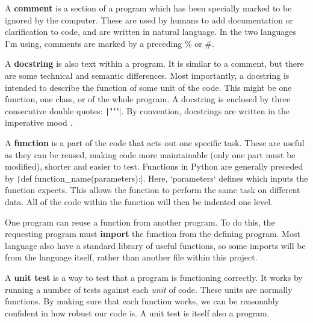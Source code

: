 \documentclass[a4paper,11pt]{article}
\begin{document}
    \begin{definition}
    A \textbf{comment} is a section of a program which has been specially marked
    to be ignored by the computer. These are used by humans to add documentation
    or clarification to code, and are written in natural language.  In the two
    languages I'm using, comments are marked by a preceding \% or \#.
    \end{definition}

    \begin{definition}
    A \textbf{docstring} is also text within a program. It is similar to a
    comment, but there are some technical and semantic differences. Most
    importantly, a docstring is intended to describe the function of some unit
    of the code. This might be one function, one class, or of the whole program.
    A docstring is enclosed by three consecutive double quotes:
    \texttt|"""|. By convention, docstrings are written in the
    imperative mood \cite{PEPDocstrings2014Goodger}.
    \end{definition}

    \begin{definition}
    A \textbf{function} is a part of the code that acts out one specific task.
    These are useful as they can be reused, making code more maintainable (only
    one part must be modified), shorter and easier to test. Functions in Python
    are generally preceded by \texttt|def
    function_name(parameters):|.  Here, `parameters` defines which inputs the
    function expects. This allows the function to perform the same task on
    different data. All of the code within the function will then be indented
    one level.
    \end{definition}

    \begin{definition}
    One program can reuse a function from another program. To do this, the
    requesting program must \textbf{import} the function from the defining
    program. Most language also have a standard library of useful functions, so
    some imports will be from the language itself, rather than another file
    within this project.
    \end{definition}

    \begin{definition}
    A \textbf{unit test} is a way to test that a program is functioning
    correctly. It works by running a number of tests against each \textit{unit}
    of code. These units are normally functions. By making sure that each
    function works, we can be reasonably confident in how robust our code is. A
    unit test is itself also a program.
    \end{definition}
\end{document}
